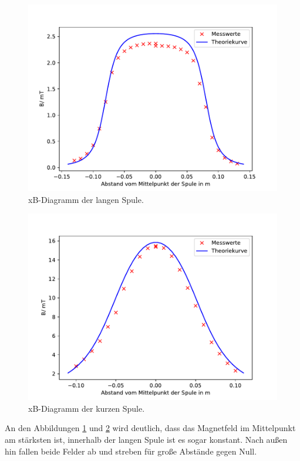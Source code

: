 \begin{figure}[H]
  \centering
  \includegraphics{LangeSpule.pdf}
  \caption{xB-Diagramm der langen Spule.}
  \label{fig:LangeSpule}
\end{figure}
\begin{figure}[H]
  \includegraphics{KurzeSpule.pdf}
  \caption{xB-Diagramm der kurzen Spule.}
  \label{fig:KurzeSpule}
\end{figure}

\noindent An den Abbildungen \ref{fig:LangeSpule} und \ref{fig:KurzeSpule}
wird deutlich, dass das Magnetfeld im Mittelpunkt
am stärksten ist, innerhalb der langen Spule ist es
sogar konstant. Nach außen hin fallen beide Felder
ab und streben für große Abstände gegen Null.



\label{sec:Auswertung}

